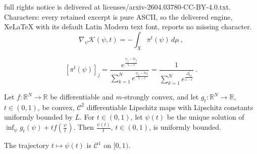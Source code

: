 \documentclass[10pt,a4paper]{amsart}
\newcommand{\R}{{\mathbb R}}
\begin{document}
full rights notice is delivered at licenses/arxiv-2604.03780-CC-BY-4.0.txt. Characters: every retained excerpt is pure ASCII, so the delivered engine, XeLaTeX with its default Latin Modern text font, reports no missing character.
\begin{equation}\label{eqn: regulairzed grad wrt phi}
    \nabla_\psi\mathcal{K}(\psi,t) = - \int_X \pi^t(\psi)\,d\mu\ ,
\end{equation}

\begin{equation}\label{eqn: regularized laguerre integrand}
    [\pi^t(\psi)]_j = \frac{e^{ \frac{\psi_j-tc_j}{1-t}}}{ \sum_{k=1}^N e^{ \frac{\psi_k-tc_k}{1-t}}} = \frac{1}{\sum_{k=1}^N e^{\frac{\Delta_{kj}^t}{1-t}}}\ .
\end{equation}

\begin{lem}\label{lem:uniformly_bounded_solutions}
    Let $f : \R^N\to\R$ be differentiable and $m$-strongly convex, and let $g_t:\R^N\to\R$, $t\in(0,1)$, be convex, $\mathcal{C}^2$ differentiable Lipschitz maps with Lipschitz constants uniformly bounded by $L$. For $t\in(0,1)$, let $\psi(t)$ be the unique solution of $\inf_{\psi} g_t(\psi)+tf(\frac{\psi}{t})$. Then $\frac{\psi(t)}{t}$, $t\in(0,1)$, is uniformly bounded.
\end{lem}

\begin{lem}
    The trajectory $t\mapsto\psi(t)$ is $\mathcal{C}^1$ on $[0,1)$.
\end{lem}
\end{document}
